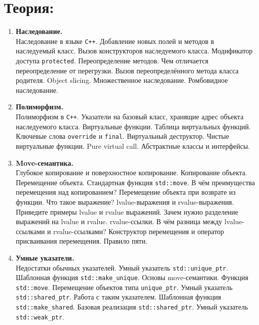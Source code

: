 \documentclass{article}
\begin{document}

\section*{Теория:}
\begin{enumerate}


\item \textbf{Наследование.}\\
Наследование в языке \texttt{C++}. Добавление новых полей и методов в наследуемый класс. Вызов конструкторов наследуемого класса. Модификатор доступа \texttt{protected}. Переопределение методов. Чем отличается переопределение от перегрузки. Вызов переопределённого метода класса родителя. Object slicing. Множественное наследование. Ромбовидное наследование.

\item \textbf{Полиморфизм.}\\
Полиморфизм в \texttt{C++}. Указатели на базовый класс, хранящие адрес объекта наследуемого класса.  Виртуальные функции. Таблица виртуальных функций. Ключевые слова \texttt{override} и \texttt{final}. Виртуальный деструктор. Чистые виртуальные функции. Pure virtual call. Абстрактные классы и интерфейсы.

\item \textbf{Move-семантика.}\\
Глубокое копирование и поверхностное копирование. Копирование объекта. Перемещение объекта. Стандартная функция \texttt{std::move}. В чём преимущества перемещения над копированием? Перемещение объекта при возврате из функции. Что такое выражение? lvalue-выражения и rvalue-выражения. Приведите примеры lvalue и rvalue выражений. Зачем нужно разделение выражений на lvalue и rvalue. rvalue-ссылки. В чём разница между lvalue-ссылками и rvalue-ссылками? Конструктор перемещения и оператор присваивания перемещения. Правило пяти.

\item \textbf{Умные указатели.}\\
Недостатки обычных указателей. Умный указатель \texttt{std::unique\_ptr}. Шаблонная функция \texttt{std::make\_unique}. Основы move-семантики. Функция \texttt{std::move}. Перемещение объектов типа \texttt{unique\_ptr}. Умный указатель \texttt{std::shared\_ptr}. Работа с таким указателем. Шаблонная функция \texttt{std::make\_shared}. Базовая реализация \texttt{std::shared\_ptr}. Умный указатель \texttt{std::weak\_ptr}.





\end{enumerate}
\end{document}
